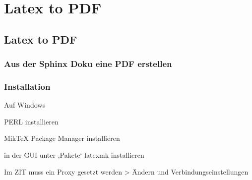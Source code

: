 \documentclass[letterpaper,10pt,ngerman]{sphinxmanual}
\begin{document}
\sphinxstepscope


\chapter{Latex to PDF}
\label{\detokenize{latexpdf/index:latex-to-pdf}}\label{\detokenize{latexpdf/index::doc}}
\sphinxstepscope


\section{Latex to PDF}
\label{\detokenize{latexpdf/latextopdf:latex-to-pdf}}\label{\detokenize{latexpdf/latextopdf::doc}}

\subsection{Aus der Sphinx Doku eine PDF erstellen}
\label{\detokenize{latexpdf/latextopdf:aus-der-sphinx-doku-eine-pdf-erstellen}}
\begin{sphinxVerbatim}[commandchars=\\\{\}]
 
\end{sphinxVerbatim}


\subsection{Installation}
\label{\detokenize{latexpdf/latextopdf:installation}}
\begin{DUlineblock}{0em}
\item[] Auf Windows
\item[] \sphinxhyphen{}PERL installieren
\item[]
\begin{DUlineblock}{\DUlineblockindent}
\item[] 
\end{DUlineblock}
\item[] \sphinxhyphen{}MikTeX Package Manager installieren
\item[]
\begin{DUlineblock}{\DUlineblockindent}
\item[]
\begin{DUlineblock}{\DUlineblockindent}
\item[] 
\end{DUlineblock}
\item[] \sphinxhyphen{}in der GUI unter ‚Pakete‘ latexmk installieren
\item[]
\begin{DUlineblock}{\DUlineblockindent}
\item[] \sphinxhyphen{}Im ZIT muss ein Proxy gesetzt werden \sphinxhyphen{}\textgreater{} Ändern und Verbindungseinstellungen
\end{DUlineblock}
\end{DUlineblock}
\end{DUlineblock}
\end{document}

